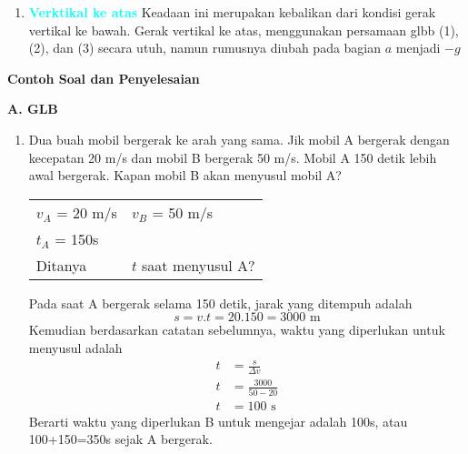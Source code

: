 \documentclass[10pt,a4paper]{article}
\newcommand{\unhide}[1]{
\begin{mybox}
#1\end{mybox}}
\begin{document}
\begin{multicols*}{2}
\begin{enumerate}[label=\Alph*.,topsep=0mm,leftmargin=*]
\item \textcolor{cyan}{\textbf{Verktikal ke atas}}
Keadaan ini merupakan kebalikan dari kondisi gerak vertikal ke bawah. Gerak vertikal ke atas, menggunakan persamaan glbb (1), (2), dan (3) secara utuh, namun rumusnya diubah pada bagian $a$ menjadi $-g$



\begin{center}
\end{center}

\end{enumerate}

\begin{catatan}\textbf{Contoh Soal dan Penyelesaian}\end{catatan}
\textbf{A. GLB}
\begin{enumerate}[topsep=0pt,itemsep=0pt,leftmargin=*]
\item Dua buah mobil bergerak ke arah yang sama. Jik mobil A bergerak dengan kecepatan 20 m/s dan mobil B bergerak 50 m/s. Mobil A 150 detik lebih awal bergerak. Kapan mobil B akan menyusul mobil A?

\unhide{
\begin{tabular}{ll}
$v_A$ = 20 m/s & $v_B$ = 50 m/s \\
$t_A$ = 150s &  \\
Ditanya & $t$ saat menyusul A? \\
\end{tabular}
Pada saat A bergerak selama 150 detik, jarak yang ditempuh adalah
$$s= v.t = 20.150 = 3000\text{ m}$$
Kemudian berdasarkan catatan sebelumnya, waktu yang diperlukan untuk menyusul adalah
\begin{align*}
t&=\frac{s}{\Delta v} \\
t&=\frac{3000}{50-20}\\
t&=100 \text{ s}
\end{align*}
Berarti waktu yang diperlukan B untuk mengejar adalah 100s, atau 100+150=350s sejak A bergerak.}


\end{enumerate}
\end{multicols*}
\end{document}
